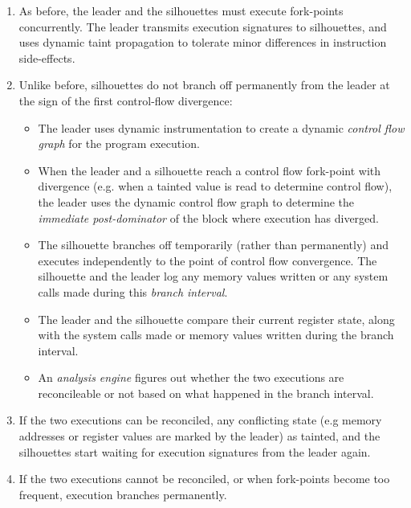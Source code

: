 \begin{enumerate}

\item As before, the leader and the
  silhouettes must execute fork-points concurrently. The leader 
  transmits execution signatures to silhouettes, and uses dynamic taint propagation 
  to tolerate minor differences in instruction side-effects.

\item Unlike before, silhouettes do not branch off permanently
  from the leader at the sign of the first control-flow divergence:

\begin{itemize}
\item The leader uses dynamic instrumentation to
  create a dynamic {\em control flow graph}
  for the program execution.

\item  When the leader and a silhouette reach a
  control flow fork-point with divergence (e.g. when a tainted value
  is read to determine control flow), the
  leader uses the dynamic control flow
  graph to determine the {\em immediate post-dominator}
  of the block where execution has diverged.

\item   The silhouette branches off
  temporarily (rather than permanently)
  and executes independently to the 
  point of control flow convergence.
  The silhouette and the leader log
  any memory values written 
  or any system calls made
  during this {\em branch interval}.

\item 
  The leader and the silhouette
  compare their current register state, along with the system calls made
  or memory values written during the branch interval. 

\item  An {\em analysis engine} figures out
  whether the two executions are reconcileable
  or not based on what happened
  in the branch interval. 
\end{itemize}

\item 
  If the two executions can be reconciled,
  any conflicting state (e.g memory addresses 
  or register values are
  marked by the leader) as tainted,
  and the silhouettes start
  waiting for execution signatures
  from the leader again.

\item 
  If the two executions cannot be reconciled,
  or when fork-points become too frequent,
  execution branches permanently.

\end{enumerate}

